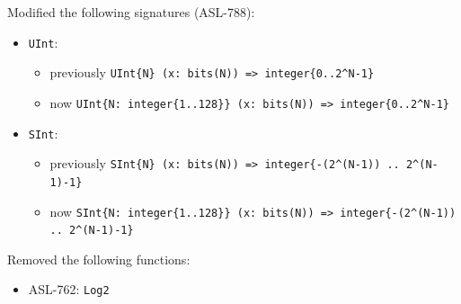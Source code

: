 \noindent
Modified the following signatures (ASL-788):
\begin{itemize}
  \item \texttt{UInt}:
    \begin{itemize}
      \item previously \verb|UInt{N} (x: bits(N)) => integer{0..2^N-1}|
      \item now \verb|UInt{N: integer{1..128}} (x: bits(N)) => integer{0..2^N-1}|
    \end{itemize}
  \item \texttt{SInt}:
    \begin{itemize}
      \item previously \verb|SInt{N} (x: bits(N)) => integer{-(2^(N-1)) .. 2^(N-1)-1}|
      \item now \verb|SInt{N: integer{1..128}} (x: bits(N)) => integer{-(2^(N-1)) .. 2^(N-1)-1}|
    \end{itemize}
\end{itemize}

\noindent
Removed the following functions:
\begin{itemize}
  \item ASL-762: \texttt{Log2}
\end{itemize}
